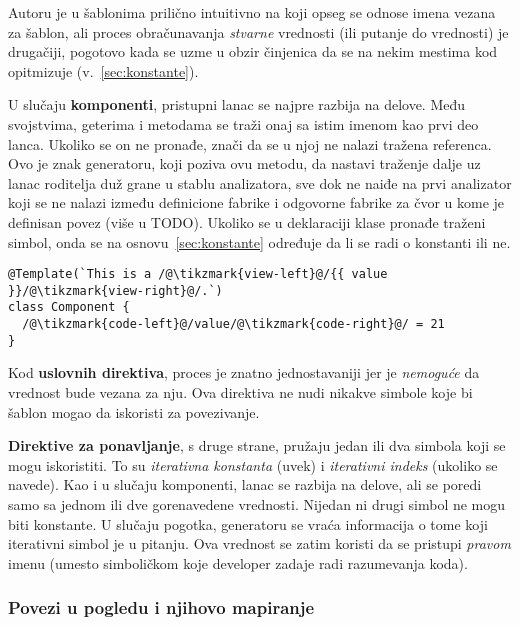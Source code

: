 Autoru je u šablonima prilično intuitivno na koji opseg se odnose imena vezana za šablon, ali proces obračunavanja \emph{stvarne} vrednosti (ili putanje do vrednosti) je drugačiji, pogotovo kada se uzme u obzir činjenica da se na nekim mestima kod opitmizuje (v.~\cref{sec:konstante}).

U slučaju \textbf{komponenti}, pristupni lanac se najpre razbija na delove.
Među svojstvima, geterima i metodama se traži onaj sa istim imenom kao prvi deo lanca.
Ukoliko se on ne pronađe, znači da se u njoj ne nalazi tražena referenca.
Ovo je znak generatoru, koji poziva ovu metodu, da nastavi traženje dalje uz lanac roditelja duž grane u stablu analizatora, sve dok ne naiđe na prvi analizator koji se ne nalazi između definicione fabrike i odgovorne fabrike za čvor u kome je definisan povez (više u TODO).
Ukoliko se u deklaraciji klase pronađe traženi simbol, onda se na osnovu~\cref{sec:konstante} određuje da li se radi o konstanti ili ne.

\begin{lstlisting}
@Template(`This is a /@\tikzmark{view-left}@/{{ value }}/@\tikzmark{view-right}@/.`)
class Component {
  /@\tikzmark{code-left}@/value/@\tikzmark{code-right}@/ = 21
}
\end{lstlisting}

Kod \textbf{uslovnih direktiva}, proces je znatno jednostavaniji jer je \emph{nemoguće} da vrednost bude vezana za nju.
Ova direktiva ne nudi nikakve simbole koje bi šablon mogao da iskoristi za povezivanje.

\textbf{Direktive za ponavljanje}, s druge strane, pružaju jedan ili dva simbola koji se mogu iskoristiti.
To su \textit{iterativna konstanta} (uvek) i \textit{iterativni indeks} (ukoliko se navede).
Kao i u slučaju komponenti, lanac se razbija na delove, ali se poredi samo sa jednom ili dve gorenavedene vrednosti.
Nijedan ni drugi simbol ne mogu biti konstante.
U slučaju pogotka, generatoru se vraća informacija o tome koji iterativni simbol je u pitanju.
Ova vrednost se zatim koristi da se pristupi \emph{pravom} imenu (umesto simboličkom koje developer zadaje radi razumevanja koda).

\subsubsection{Povezi u pogledu i njihovo mapiranje}\label{sec:getPropsBoundToView}


